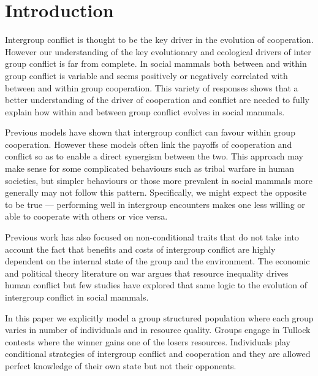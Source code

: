 \section{Introduction}

Intergroup conflict is thought to be the key driver in the evolution of cooperation. However our understanding of the key evolutionary and ecological drivers of inter group conflict is far from complete. In social mammals both between and within group conflict is variable and seems positively or negatively correlated with between and within group cooperation. This variety of responses shows that a better understanding of the driver of cooperation and conflict are needed to fully explain how within and between group conflict evolves in social mammals. 

Previous models have shown that intergroup conflict can favour within group cooperation. However these models often link the payoffs of cooperation and conflict so as to enable a direct synergism between the two. This approach may make sense for some complicated behaviours such as tribal warfare in human societies, but simpler behaviours or those more prevalent in social mammals more generally may not follow this pattern. Specifically, we might expect the opposite to be true --- performing well in intergroup encounters makes one less willing or able to cooperate with others or vice versa.

Previous work has also focused on non-conditional traits that do not take into account the fact that benefits and costs of intergroup conflict are highly dependent on the internal state of the group and the environment. The economic and political theory literature on war argues that resource inequality drives human conflict but few studies have explored that same logic to the evolution of intergroup conflict in social mammals. 

In this paper we explicitly model a group structured population where each group varies in number of individuals and in resource quality. Groups engage in Tullock contests where the winner gains one of the losers resources. Individuals play conditional strategies of intergroup conflict and cooperation and they are allowed perfect knowledge of their own state but not their opponents. 